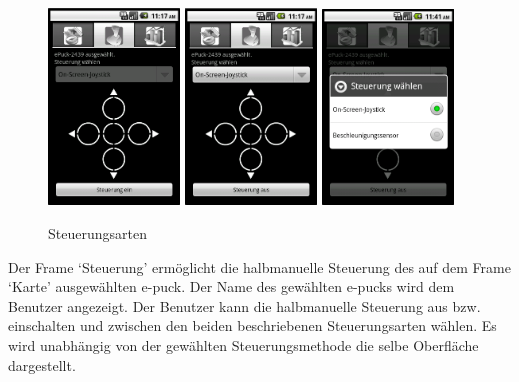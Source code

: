 \documentclass[10pt,a4paper]{article}
\begin{document}
			\begin{figure}[h]
				  \centering
				\includegraphics[width=3.5cm]{screenshots/android2.png}
				\includegraphics[width=3.5cm]{screenshots/android2a.png}
				\includegraphics[width=3.5cm]{screenshots/android2c.png}
  				\caption{Steuerungsarten}
  			\end{figure}	
			
			Der Frame `Steuerung' ermöglicht die halbmanuelle Steuerung des auf dem Frame `Karte' ausgewählten e-puck.			
			Der Name des gewählten e-pucks wird dem Benutzer angezeigt. Der Benutzer kann die halbmanuelle Steuerung
			aus bzw. einschalten und zwischen den beiden beschriebenen Steuerungsarten wählen. Es wird unabhängig von der
			gewählten Steuerungsmethode die selbe Oberfläche dargestellt.
\end{document}
